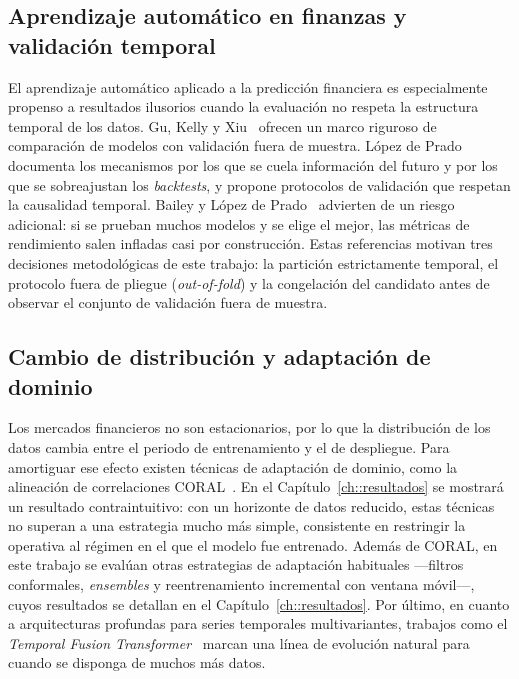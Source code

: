 \subsection{Aprendizaje automático en finanzas y validación temporal}

El aprendizaje automático aplicado a la predicción financiera es especialmente propenso a
resultados ilusorios cuando la evaluación no respeta la estructura temporal de los datos.
Gu, Kelly y Xiu~\cite{gu2020empirical} ofrecen un marco riguroso de comparación de modelos
con validación fuera de muestra. López de Prado~\cite{lopezdeprado2018} documenta los
mecanismos por los que se cuela información del futuro y por los que se sobreajustan los
\emph{backtests}, y propone protocolos de validación que respetan la causalidad temporal.
Bailey y López de Prado~\cite{bailey2014deflated} advierten de un riesgo adicional: si se
prueban muchos modelos y se elige el mejor, las métricas de rendimiento salen infladas casi
por construcción. Estas referencias motivan tres decisiones metodológicas de este trabajo:
la partición estrictamente temporal, el protocolo fuera de pliegue (\emph{out-of-fold}) y
la congelación del candidato antes de observar el conjunto de validación fuera de muestra.

\subsection{Cambio de distribución y adaptación de dominio}

Los mercados financieros no son estacionarios, por lo que la distribución de los datos
cambia entre el periodo de entrenamiento y el de despliegue. Para amortiguar ese efecto
existen técnicas de adaptación de dominio, como la alineación de correlaciones
CORAL~\cite{sun2016coral}. En el Capítulo~\ref{ch::resultados} se mostrará un resultado
contraintuitivo: con un horizonte de datos reducido, estas técnicas no superan a una
estrategia mucho más simple, consistente en restringir la operativa al régimen en el que
el modelo fue entrenado. Además de CORAL, en este trabajo se evalúan otras estrategias de
adaptación habituales —filtros conformales, \emph{ensembles} y reentrenamiento incremental
con ventana móvil—, cuyos resultados se detallan en el Capítulo~\ref{ch::resultados}. Por
último, en cuanto a arquitecturas profundas para series temporales multivariantes, trabajos
como el \emph{Temporal Fusion Transformer}~\cite{lim2021tft} marcan una línea de evolución
natural para cuando se disponga de muchos más datos.

